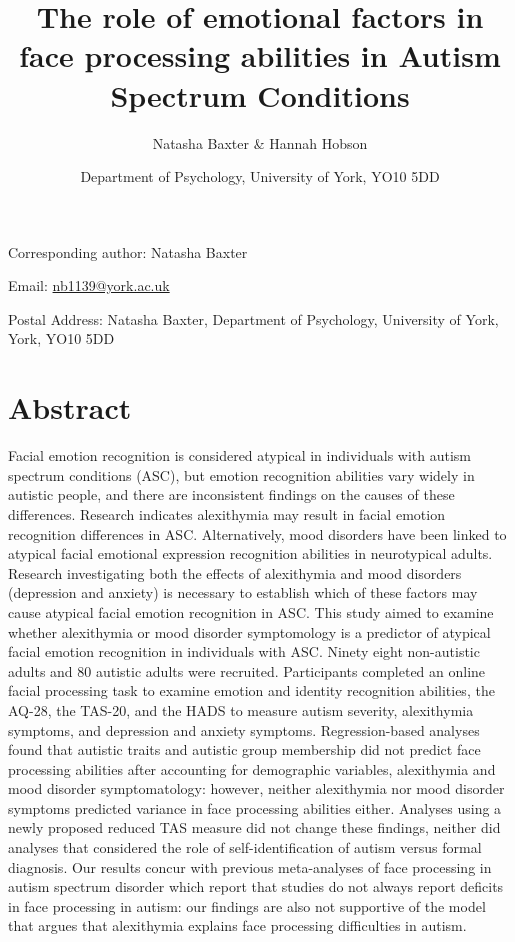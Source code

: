 \documentclass[
]{article}
\title{The role of emotional factors in face processing abilities in Autism Spectrum Conditions}
\author{Natasha Baxter \& Hannah Hobson}
\date{Department of Psychology, University of York, YO10 5DD}
\begin{document}
\maketitle

Corresponding author: Natasha Baxter

Email: \url{nb1139@york.ac.uk}

Postal Address: Natasha Baxter, Department of Psychology, University of York, York, YO10 5DD

\hypertarget{abstract}{%
\section*{Abstract}\label{abstract}}

Facial emotion recognition is considered atypical in individuals with autism spectrum conditions (ASC), but emotion recognition abilities vary widely in autistic people, and there are inconsistent findings on the causes of these differences. Research indicates alexithymia may result in facial emotion recognition differences in ASC. Alternatively, mood disorders have been linked to atypical facial emotional expression recognition abilities in neurotypical adults. Research investigating both the effects of alexithymia and mood disorders (depression and anxiety) is necessary to establish which of these factors may cause atypical facial emotion recognition in ASC. This study aimed to examine whether alexithymia or mood disorder symptomology is a predictor of atypical facial emotion recognition in individuals with ASC. Ninety eight non-autistic adults and 80 autistic adults were recruited. Participants completed an online facial processing task to examine emotion and identity recognition abilities, the AQ-28, the TAS-20, and the HADS to measure autism severity, alexithymia symptoms, and depression and anxiety symptoms. Regression-based analyses found that autistic traits and autistic group membership did not predict face processing abilities after accounting for demographic variables, alexithymia and mood disorder symptomatology: however, neither alexithymia nor mood disorder symptoms predicted variance in face processing abilities either. Analyses using a newly proposed reduced TAS measure did not change these findings, neither did analyses that considered the role of self-identification of autism versus formal diagnosis. Our results concur with previous meta-analyses of face processing in autism spectrum disorder which report that studies do not always report deficits in face processing in autism: our findings are also not supportive of the model that argues that alexithymia explains face processing difficulties in autism.
\end{document}
